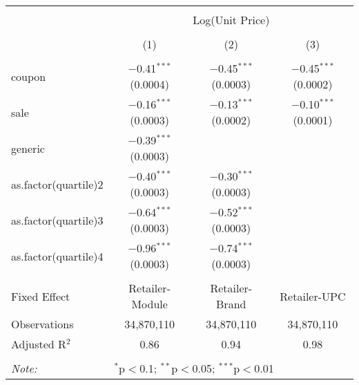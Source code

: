 
\begin{table}[!htbp] \centering 
  \caption{} 
  \label{tab:overallSavingsStorable} 
\begin{tabular}{@{\extracolsep{5pt}}lccc} 
\\[-1.8ex]\hline 
\hline \\[-1.8ex] 
 & \multicolumn{3}{c}{Log(Unit Price)} \\ 
\\[-1.8ex] & (1) & (2) & (3)\\ 
\hline \\[-1.8ex] 
 coupon & $-$0.41$^{***}$ (0.0004) & $-$0.45$^{***}$ (0.0003) & $-$0.45$^{***}$ (0.0002) \\ 
  sale & $-$0.16$^{***}$ (0.0003) & $-$0.13$^{***}$ (0.0002) & $-$0.10$^{***}$ (0.0001) \\ 
  generic & $-$0.39$^{***}$ (0.0003) &  &  \\ 
  as.factor(quartile)2 & $-$0.40$^{***}$ (0.0003) & $-$0.30$^{***}$ (0.0003) &  \\ 
  as.factor(quartile)3 & $-$0.64$^{***}$ (0.0003) & $-$0.52$^{***}$ (0.0003) &  \\ 
  as.factor(quartile)4 & $-$0.96$^{***}$ (0.0003) & $-$0.74$^{***}$ (0.0003) &  \\ 
 \hline \\[-1.8ex] 
Fixed Effect & Retailer-Module & Retailer-Brand & Retailer-UPC \\ 
Observations & 34,870,110 & 34,870,110 & 34,870,110 \\ 
Adjusted R$^{2}$ & 0.86 & 0.94 & 0.98 \\ 
\hline 
\hline \\[-1.8ex] 
\textit{Note:}  & \multicolumn{3}{l}{$^{*}$p$<$0.1; $^{**}$p$<$0.05; $^{***}$p$<$0.01} \\ 
\end{tabular} 
\end{table} 
